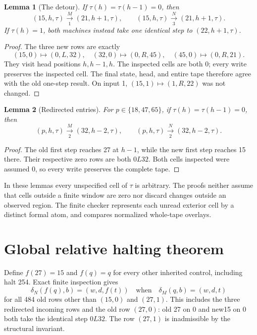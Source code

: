 \documentclass[11pt]{article}
\newtheorem{lemma}{Lemma}
\begin{document}
\begin{lemma}[The detour]
If $\tau(h)=\tau(h-1)=0$, then
\[
 (15,h,\tau)\xrightarrow[1]{M}(21,h+1,\tau),\qquad
 (15,h,\tau)\xrightarrow[3]{N}(21,h+1,\tau).
\]
If $\tau(h)=1$, both machines instead take one identical step to
$(22,h+1,\tau)$.
\end{lemma}
\begin{proof}
The three new rows are exactly
\[
 (15,0)\mapsto(0,L,32),\quad
 (32,0)\mapsto(0,R,45),\quad
 (45,0)\mapsto(0,R,21).
\]
They visit head positions $h,h-1,h$. The inspected cells are both 0;
every write preserves the inspected cell. The final state, head, and
entire tape therefore agree with the old one-step result. On input 1,
$(15,1)\mapsto(1,R,22)$ was not changed.
\end{proof}

\begin{lemma}[Redirected entries]
For $p\in\{18,47,65\}$, if $\tau(h)=\tau(h-1)=0$, then
\[
 (p,h,\tau)\xrightarrow[2]{M}(32,h-2,\tau),\qquad
 (p,h,\tau)\xrightarrow[2]{N}(32,h-2,\tau).
\]
\end{lemma}
\begin{proof}
The old first step reaches 27 at $h-1$, while the new first step reaches 15
there. Their respective zero rows are both $0L32$. Both cells inspected
were assumed 0, so every write preserves the complete tape.
\end{proof}

In these lemmas every unspecified cell of $\tau$ is arbitrary. The proofs
neither assume that cells outside a finite window are zero nor discard
changes outside an observed region. The finite checker represents each
unread exterior cell by a distinct formal atom, and compares normalized
whole-tape overlays.

\section{Global relative halting theorem}

Define $f(27)=15$ and $f(q)=q$ for every other inherited control,
including halt 254. Exact finite inspection gives
\[
 \delta_N(f(q),b)=(w,d,f(t))
 \quad\text{when}\quad\delta_M(q,b)=(w,d,t)
\]
for all 484 old rows other than $(15,0)$ and $(27,1)$. This includes the
three redirected incoming rows and the old row $(27,0)$:
old 27 on 0 and new15 on 0 both take the identical step $0L32$.
The row $(27,1)$ is inadmissible by the structural invariant.
\end{document}
